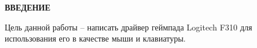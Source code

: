 \begin{center}
    {\bfseries\Large ВВЕДЕНИЕ}
\end{center}




Цель данной работы -- написать драйвер геймпада Logitech F310 для использования его в качестве мыши и клавиатуры.

\pagebreak
